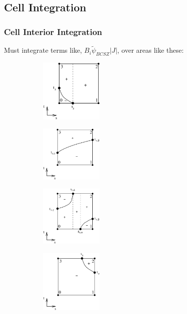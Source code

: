 \documentclass{beamer}
\newcommand{\B}[1]{\ensuremath{B_{#1} }}			%
\newcommand{\abs}[1]{\ensuremath{\left\lvert #1 \right\rvert}}  %
\newcommand{\BCSZ}{\ensuremath{\widetilde{\psi}_{BCSZ}}}
\begin{document}
\subsection{Cell Integration}
\begin{frame}
\frametitle{Cell Interior Integration}
Must integrate terms like, $\B{i} \BCSZ \abs{J}$, over areas like these:
\begin{figure}[!hbp]
	\centering
	\begin{subfigure}{0.32\textwidth}
		\centering
		\includegraphics[width=1.2in]{one_neg_pdt_int} 		
  \end{subfigure}
	\begin{subfigure}{0.32\textwidth}
		\centering
		\includegraphics[width=1.2in]{neg_same_side_pdt_int}		
	\end{subfigure}
	\begin{subfigure}{0.32\textwidth}
		\centering
		\includegraphics[width=1.2in]{opp_neg_more_pos_pdt_int}
	\end{subfigure}
	\begin{subfigure}{0.32\textwidth}
	\centering
		\includegraphics[width=1.2in]{three_neg_pdt_int} 
	\end{subfigure}
	\begin{subfigure}{0.32\textwidth}

\end{subfigure}
\end{figure}
\end{frame}
\end{document}
